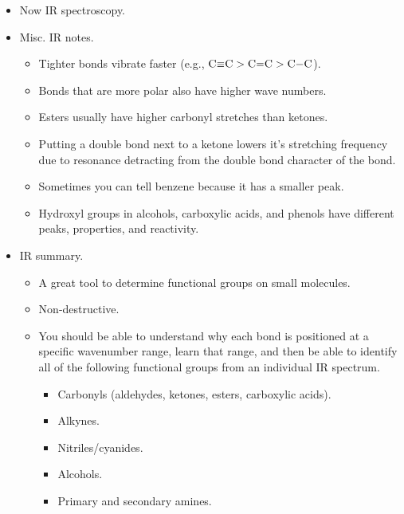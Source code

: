 \documentclass[../notes.tex]{subfiles}
\begin{document}
\begin{itemize}
    \item Now IR spectroscopy.
    \item Misc. IR notes.
    \begin{itemize}
        \item Tighter bonds vibrate faster (e.g., $\ce{C#C}>\ce{C=C}>\ce{C-C}$).
        \item Bonds that are more polar also have higher wave numbers.
        \item Esters usually have higher carbonyl stretches than ketones.
        \item Putting a double bond next to a ketone lowers it's stretching frequency due to resonance detracting from the double bond character of the  bond.
        \item Sometimes you can tell benzene because it has a smaller  peak.
        \item Hydroxyl groups in alcohols, carboxylic acids, and phenols have different peaks, properties, and reactivity.
    \end{itemize}
    \item IR summary.
    \begin{itemize}
        \item A great tool to determine functional groups on small molecules.
        \item Non-destructive.
        \item You should be able to understand why each bond is positioned at a specific wavenumber range, learn that range, and then be able to identify all of the following functional groups from an individual IR spectrum.
        \begin{itemize}
            \item Carbonyls (aldehydes, ketones, esters, carboxylic acids).
            \item Alkynes.
            \item Nitriles/cyanides.
            \item Alcohols.
            \item Primary and secondary amines.
        \end{itemize}
    \end{itemize}
\end{itemize}
\end{document}
